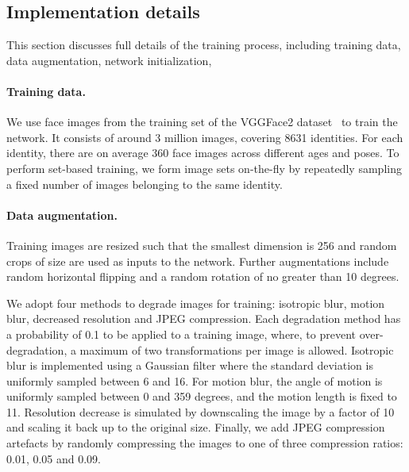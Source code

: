 \documentclass[runningheads]{llncs}
\begin{document}
\subsection{Implementation details}
\label{sec:imp}
This section discusses full details of the 
training process, including training data,
data augmentation,
network initialization, \etc

\paragraph{Training data.} 
We use face images from the training set of the
VGGFace2 dataset~\cite{Cao18} to train the network.
It consists of around 3 million images, covering 
8631 identities. For 
each identity, there are on average 360 face 
images across different ages and poses.
To perform set-based training,
we form image sets on-the-fly by repeatedly sampling
a fixed number of images belonging to the same identity.

\paragraph{Data augmentation.}
Training images are resized such that the smallest 
dimension is 256 and random crops of size 
 are used as inputs to the 
network. Further augmentations include random
horizontal flipping and a random rotation of 
no greater than 10 degrees.

We adopt four methods to degrade images for training:
isotropic blur, motion blur, decreased resolution and JPEG compression.
Each degradation method has a 
probability 
of 0.1 to be applied to a training image,
where, to prevent over-degradation, a maximum of
two transformations per image is allowed.
Isotropic blur is implemented using a Gaussian filter
where the standard deviation is uniformly sampled between 6 and 16.
For motion blur, the angle of motion is uniformly sampled
between 0 and 359 degrees, and the motion length is fixed to 11. 
Resolution decrease is simulated by downscaling the image by a factor of 10
and scaling it back up to the original size.
Finally, we add JPEG compression artefacts by randomly compressing
the images to one of three compression ratios: 0.01, 0.05 and 0.09.
\end{document}
